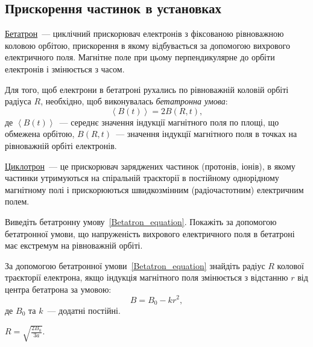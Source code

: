 \subsection*{Прискорення частинок в установках}

\begin{Theory}
\href{http://nuclphys.sinp.msu.ru/experiment/accelerators/betatron.htm}{Бетатрон}~--- циклічний  прискорювач електронів з фіксованою рівноважною коловою орбітою, прискорення в якому відбувається за допомогою вихрового електричного поля. Магнітне поле при цьому перпендикулярне до орбіти електронів і змінюється з часом.

Для того, щоб електрони в бетатроні рухались по рівноважній коловій орбіті радіуса $R$, необхідно, щоб виконувалась \emph{бетатронна умова}:
\begin{equation}\label{Betatron_equation}
	\left\langle B(t)\right\rangle  = 2 B(R,t),
\end{equation}
де $\left\langle B(t)\right\rangle$~--- середнє значення індукції магнітного поля по площі, що обмежена орбітою,  $B(R,t)$~--- значення індукції магнітного поля в точках на рівноважній орбіті електронів.

\href{http://nuclphys.sinp.msu.ru/experiment/accelerators/ciclotron.htm}{Циклотрон}~--- це прискорювач заряджених частинок (протонів, іонів), в якому частинки  утримуються на спіральній траєкторії в постійному  однорідному магнітному полі і прискорюються швидкозмінним (радіочастотним) електричним полем.
\end{Theory}

\begin{problem}
   Виведіть бетатронну умову~\ref{Betatron_equation}. Покажіть за допомогою бетатронної умови, що напруженість вихрового електричного поля в бетатроні має екстремум на рівноважній орбіті.
\end{problem}

\begin{problem}
    За допомогою бетатронної умови~\ref{Betatron_equation} знайдіть радіус $R$ колової траєкторії електрона, якщо індукція магнітного поля змінюється з відстанню $r$ від центра бетатрона за умовою:
\[
	B = B_0 - kr^2,
\]
де $B_0$ та $k$~--- додатні постійні.
\begin{solution}
	$R = \sqrt{\frac{2B_0}{3a}}.$
\end{solution}
\end{problem}

